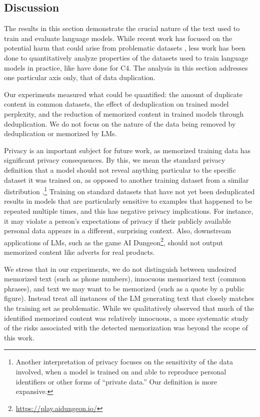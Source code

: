 \subsection{Discussion}
The results in this section demonstrate the crucial nature of the text used to train and evaluate language models.
While recent work has focused on the potential harm that could arise from problematic datasets  \cite{bender2018data, gebru2020datasheets}, less work has been done to 
quantitatively analyze properties of the datasets used to train language models in practice, like \citet{dodge2021documenting} have done for C4.
The analysis in this section addresses one particular axis only, that of data duplication.

Our experiments measured what could be quantified: the amount of duplicate content in common datasets, the effect of deduplication on trained model perplexity, and the reduction of memorized content in trained models through deduplication.
We do not focus on the nature of the data being removed by deduplication or memorized by LMs.

Privacy is an important subject for future work, as memorized training data has significant privacy consequences.
By this, we mean the standard privacy definition that a model should not reveal anything particular to the specific dataset it was trained on, as opposed to another training dataset from a similar distribution \citep{shokri2017membership}.\footnote{%
Another interpretation of privacy focuses on the sensitivity of the data involved, when a model is trained on and able to reproduce personal identifiers or other forms of ``private data.'' Our definition is more expansive.}
Training on standard datasets that have not yet been deduplicated results in models that are particularly sensitive to examples that happened to be repeated multiple times, and this has negative privacy implications.
For instance, it may violate a person's expectations of privacy if their publicly available personal data appears in a different, surprising context.
Also, downstream applications of LMs, such as the game AI Dungeon\footnote{\url{https://play.aidungeon.io/}}, should not output memorized content like adverts for real products. 

We stress that in our experiments, we do not distinguish between undesired memorized text (such as phone numbers), innocuous memorized text (common phrases), and text we may want to be memorized (such as a quote by a public figure).
Instead treat all instances of the LM generating text that closely matches the training set as problematic.
While we qualitatively observed that much of the identified memorized content was relatively innocuous, a more systematic study of the risks associated with the detected memorization was beyond the scope of this work.

